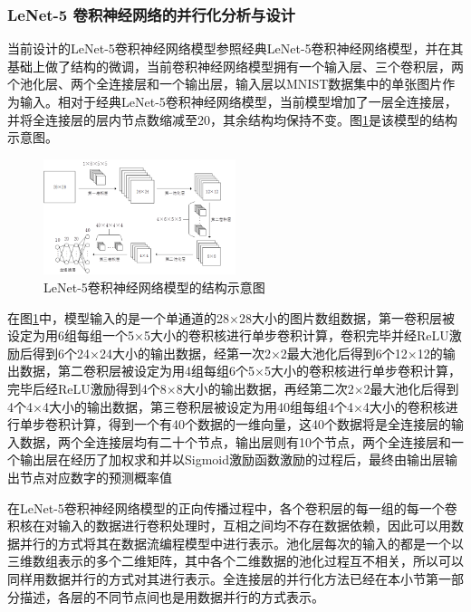 \subsubsection{LeNet-5 卷积神经网络的并行化分析与设计}

当前设计的LeNet-5卷积神经网络模型参照经典LeNet-5卷积神经网络模型，并在其基础上做了结构的微调，当前卷积神经网络模型拥有一个输入层、三个卷积层，两个池化层、两个全连接层和一个输出层，输入层以MNIST数据集中的单张图片作为输入。相对于经典LeNet-5卷积神经网络模型，当前模型增加了一层全连接层，并将全连接层的层内节点数缩减至20，其余结构均保持不变。图\ref{fig:cnn}是该模型的结构示意图。

\begin{figure}[!t]
\centering
\includegraphics[width=0.5\textwidth]{../img/Chap_Application/Yu/cnn.png}
\caption{LeNet-5卷积神经网络模型的结构示意图}
\label{fig:cnn}
\end{figure}

在图\ref{fig:cnn}中，模型输入的是一个单通道的28×28大小的图片数组数据，第一卷积层被设定为用6组每组一个5×5大小的卷积核进行单步卷积计算，卷积完毕并经ReLU激励后得到6个24×24大小的输出数据，经第一次2×2最大池化后得到6个12×12的输出数据，第二卷积层被设定为用4组每组6个5×5大小的卷积核进行单步卷积计算，完毕后经ReLU激励得到4个8×8大小的输出数据，再经第二次2×2最大池化后得到4个4×4大小的输出数据，第三卷积层被设定为用40组每组4个4×4大小的卷积核进行单步卷积计算，得到一个有40个数据的一维向量，这40个数据将是全连接层的输入数据，两个全连接层均有二十个节点，输出层则有10个节点，两个全连接层和一个输出层在经历了加权求和并以Sigmoid激励函数激励的过程后，最终由输出层输出节点对应数字的预测概率值

在LeNet-5卷积神经网络模型的正向传播过程中，各个卷积层的每一组的每一个卷积核在对输入的数据进行卷积处理时，互相之间均不存在数据依赖，因此可以用数据并行的方式将其在数据流编程模型中进行表示。池化层每次的输入的都是一个以三维数组表示的多个二维矩阵，其中各个二维数据的池化过程互不相关，所以可以同样用数据并行的方式对其进行表示。全连接层的并行化方法已经在本小节第一部分描述，各层的不同节点间也是用数据并行的方式表示。

